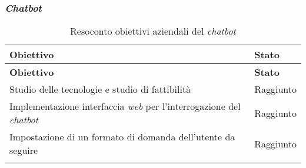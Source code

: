 \subsubsection{\textit{Chatbot}}
\begin{longtable}{|p{9cm}|p{2cm}|}
    \hline
    \rowcolor{tableheader}\textbf{Obiettivo} & \textbf{Stato} \\
    \hline
    \endfirsthead

    \rowcolor{tableheader}\textbf{Obiettivo} & \textbf{Stato}\\
    \hline
    \endhead

    \hline
    \endfoot

    \hline
    \endlastfoot

    \rowcolor{tableoddrow} Studio delle tecnologie e studio di fattibilità & Raggiunto \\
    \hline
    \rowcolor{tableevenrow} Implementazione interfaccia \textit{web} per l'interrogazione del \textit{chatbot} & Raggiunto \\
    \hline
    \rowcolor{tableoddrow} Impostazione di un formato di domanda dell'utente da seguire & Raggiunto \\
    \hline
    \caption{Resoconto obiettivi aziendali del \textit{chatbot}}
    \label{tab:resocontoobiettiviChatbot}
\end{longtable}


